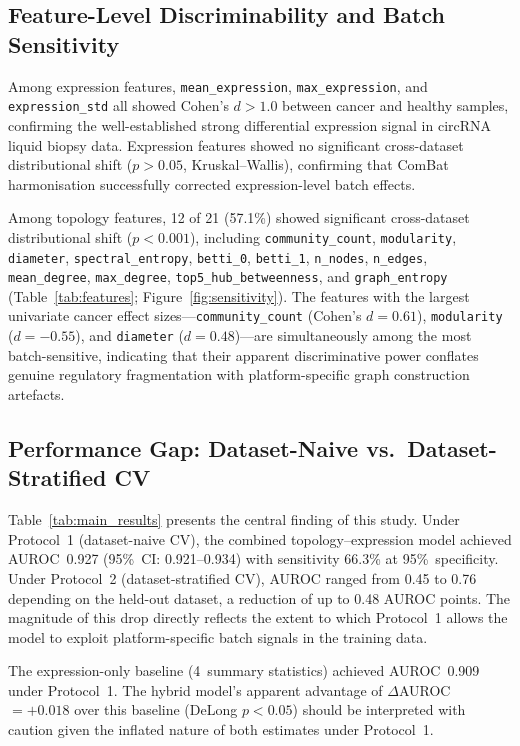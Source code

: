 \documentclass[12pt]{article}
\begin{document}
\subsection{Feature-Level Discriminability and Batch Sensitivity}

Among expression features, \texttt{mean\_expression},
\texttt{max\_expression}, and \texttt{expression\_std} all showed
Cohen's $d > 1.0$ between cancer and healthy samples, confirming the
well-established strong differential expression signal in circRNA
liquid biopsy data. Expression features showed no significant
cross-dataset distributional shift ($p > 0.05$, Kruskal--Wallis),
confirming that ComBat harmonisation successfully corrected
expression-level batch effects.

Among topology features, 12 of 21 (57.1\%) showed significant
cross-dataset distributional shift ($p < 0.001$), including
\texttt{community\_count}, \texttt{modularity}, \texttt{diameter},
\texttt{spectral\_entropy}, \texttt{betti\_0}, \texttt{betti\_1},
\texttt{n\_nodes}, \texttt{n\_edges}, \texttt{mean\_degree},
\texttt{max\_degree}, \texttt{top5\_hub\_betweenness}, and
\texttt{graph\_entropy} (Table~\ref{tab:features};
Figure~\ref{fig:sensitivity}). The features with the largest
univariate cancer effect sizes---\texttt{community\_count}
(Cohen's $d=0.61$), \texttt{modularity} ($d=-0.55$), and
\texttt{diameter} ($d=0.48$)---are simultaneously among the most
batch-sensitive, indicating that their apparent discriminative power
conflates genuine regulatory fragmentation with platform-specific
graph construction artefacts.

\subsection{Performance Gap: Dataset-Naive vs.\ Dataset-Stratified CV}

Table~\ref{tab:main_results} presents the central finding of this
study. Under Protocol~1 (dataset-naive CV), the combined
topology--expression model achieved AUROC~0.927 (95\%~CI:
0.921--0.934) with sensitivity 66.3\% at 95\%~specificity.
Under Protocol~2 (dataset-stratified CV), AUROC ranged from 0.45 to
0.76 depending on the held-out dataset, a reduction of up to 0.48
AUROC points. The magnitude of this drop directly reflects the extent
to which Protocol~1 allows the model to exploit platform-specific
batch signals in the training data.

The expression-only baseline (4~summary statistics) achieved
AUROC~0.909 under Protocol~1. The hybrid model's apparent advantage
of $\Delta$AUROC~$=+0.018$ over this baseline (DeLong $p < 0.05$)
should be interpreted with caution given the inflated nature of both
estimates under Protocol~1.
\end{document}
